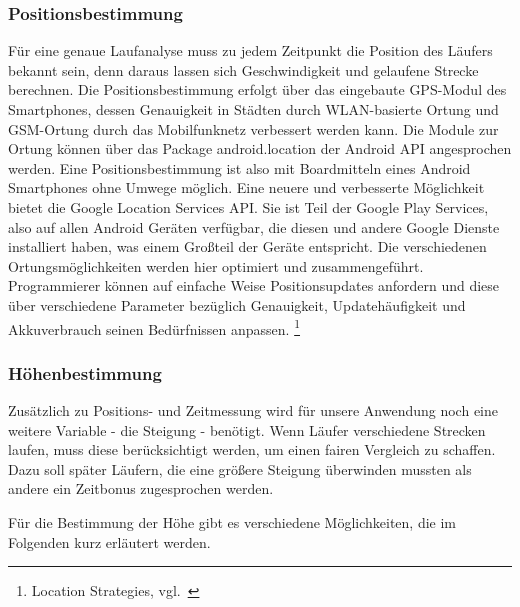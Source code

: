 \subsubsection{Positionsbestimmung}
Für eine genaue Laufanalyse muss zu jedem Zeitpunkt die Position des Läufers bekannt sein, denn daraus lassen sich Geschwindigkeit und gelaufene Strecke berechnen. Die Positionsbestimmung erfolgt über das eingebaute GPS-Modul des Smartphones, dessen Genauigkeit in Städten durch WLAN-basierte Ortung und GSM-Ortung durch das Mobilfunknetz verbessert werden kann. Die Module zur Ortung können über das Package android.location der Android API angesprochen werden. Eine Positionsbestimmung ist also mit Boardmitteln eines Android Smartphones ohne Umwege möglich. Eine neuere und verbesserte Möglichkeit bietet die Google Location Services API. Sie ist Teil der Google Play Services, also auf allen Android Geräten verfügbar, die diesen und andere Google Dienste installiert haben, was einem Großteil der Geräte entspricht. Die verschiedenen Ortungsmöglichkeiten werden hier optimiert und zusammengeführt. Programmierer können auf einfache Weise Positionsupdates anfordern und diese über verschiedene Parameter bezüglich Genauigkeit, Updatehäufigkeit und Akkuverbrauch seinen Bedürfnissen anpassen. \footnote{Location Strategies, vgl.~\cite{androidlocation}}
\subsubsection{Höhenbestimmung}
Zusätzlich zu Positions- und Zeitmessung wird für unsere Anwendung noch eine weitere Variable - die Steigung - benötigt. Wenn Läufer verschiedene Strecken laufen, muss diese berücksichtigt werden, um einen fairen Vergleich zu schaffen. Dazu soll später Läufern, die eine größere Steigung überwinden mussten als andere ein Zeitbonus zugesprochen werden.

Für die Bestimmung der Höhe gibt es verschiedene Möglichkeiten, die im Folgenden kurz erläutert werden.
